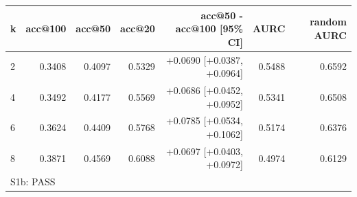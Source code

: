 \begin{tabular}{lrrrrrr}
\toprule
k & acc@100 & acc@50 & acc@20 & acc@50 - acc@100 [95\% CI] & AURC & random AURC \\
\midrule
2 & 0.3408 & 0.4097 & 0.5329 & +0.0690 [+0.0387, +0.0964] & 0.5488 & 0.6592 \\
4 & 0.3492 & 0.4177 & 0.5569 & +0.0686 [+0.0452, +0.0952] & 0.5341 & 0.6508 \\
6 & 0.3624 & 0.4409 & 0.5768 & +0.0785 [+0.0534, +0.1062] & 0.5174 & 0.6376 \\
8 & 0.3871 & 0.4569 & 0.6088 & +0.0697 [+0.0403, +0.0972] & 0.4974 & 0.6129 \\
\midrule
\multicolumn{7}{l}{S1b: PASS} \\
\bottomrule
\end{tabular}
